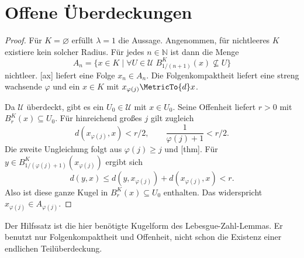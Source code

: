 \section{Offene Überdeckungen}

\begin{proof}
Für \(K=\varnothing\) erfüllt \(\lambda=1\) die Aussage.
Angenommen, für nichtleeres \(K\) existiere kein solcher Radius.
Für jedes \(n\in\mathbb N\) ist dann die Menge
\[
 A_n=\{x\in K\mid\forall U\in\mathcal U\;
                B_{1/(n+1)}^K(x)\not\subseteq U\}
\]
nichtleer. [ax] liefert eine Folge
\(x_n\in A_n\). Die Folgenkompaktheit liefert eine streng wachsende
\(\varphi\) und ein \(x\in K\) mit \(x_{\varphi(j)}\MetricTo{d}x\).

Da \(\mathcal U\) überdeckt, gibt es ein \(U_0\in\mathcal U\) mit
\(x\in U_0\). Seine Offenheit liefert \(r>0\) mit
\(B_r^K(x)\subseteq U_0\). Für hinreichend großes \(j\) gilt zugleich
\[
 d(x_{\varphi(j)},x)<r/2,\qquad
 \frac1{\varphi(j)+1}<r/2.
\]
Die zweite Ungleichung folgt aus \(\varphi(j)\geq j\) und
[thm].
Für \(y\in B_{1/(\varphi(j)+1)}^K(x_{\varphi(j)})\) ergibt sich
\[
 d(y,x)\leq d(y,x_{\varphi(j)})+d(x_{\varphi(j)},x)<r.
\]
Also ist diese ganze Kugel in \(B_r^K(x)\subseteq U_0\) enthalten.
Das widerspricht \(x_{\varphi(j)}\in A_{\varphi(j)}\).
\end{proof}

Der Hilfssatz ist die hier benötigte Kugelform des Lebesgue-Zahl-Lemmas.
Er benutzt nur Folgenkompaktheit und Offenheit, nicht schon die Existenz
einer endlichen Teilüberdeckung.

